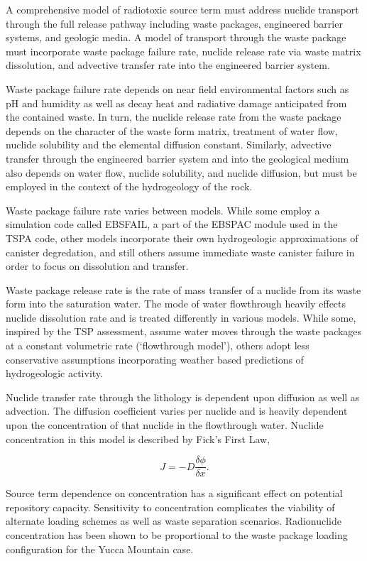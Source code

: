 A comprehensive model of radiotoxic source term must address nuclide transport
through the full release pathway including waste packages, engineered barrier
systems, and geologic media. A model of transport through the waste package
must incorporate waste package failure rate, nuclide release rate via waste
matrix dissolution, and advective transfer rate into the engineered barrier
system.  

Waste package failure rate depends on near field environmental factors such as
pH and humidity as well as decay heat and radiative damage anticipated from the
contained waste.  In turn, the nuclide release rate from the waste package
depends on the character of the waste form matrix, treatment of water flow,
nuclide solubility and the elemental diffusion constant.  Similarly, advective
transfer through the engineered barrier system and into the geological medium
also depends on water flow, nuclide solubility, and nuclide diffusion, but must
be employed in the context of the hydrogeology of the rock.   

Waste package failure rate varies between models. While some employ a
simulation code called EBSFAIL, a part of the EBSPAC module used in the TSPA
code, other models incorporate their own hydrogeologic approximations of
canister degredation, and still others assume immediate waste canister failure
in order to focus on dissolution and transfer. 

Waste package release rate is the rate of mass transfer of a nuclide from its
waste form into the saturation water. The mode of water flowthrough heavily
effects nuclide dissolution rate and is treated differently in various models.
While some, inspired by the TSP assessment, assume water moves through the
waste packages at a constant volumetric rate (`flowthrough model'), others
adopt less conservative assumptions incorporating weather based predictions of
hydrogeologic activity.

Nuclide transfer rate through the lithology is  dependent upon diffusion as
well as advection.  The diffusion coefficient varies per nuclide and is heavily
dependent upon the concentration of that nuclide in the flowthrough water.
Nuclide concentration in this model is described by Fick's First Law, 

\begin{equation} 
  J = -D\frac{\delta\phi}{\delta x}.  
\end{equation}

Source term dependence on concentration has a significant effect on potential
repository capacity. Sensitivity to concentration complicates the viability of
alternate loading schemes as well as waste separation scenarios. Radionuclide
concentration has been shown to be proportional to the waste package loading
configuration for the Yucca Mountain
case.\cite{ahn_relationship_2002,kawasaki_congruent_2004}

